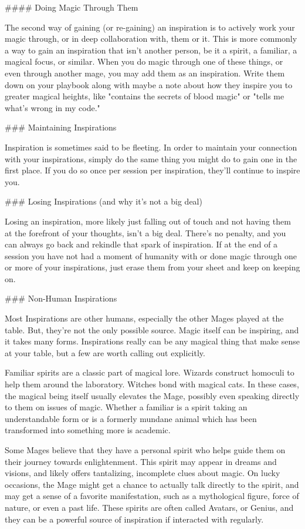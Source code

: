 \documentclass[
  oneside,
  statementpaper,
  9pt]{memoir}
\begin{document}
\begin{Player}
#### Doing Magic Through Them

The second way of gaining (or re-gaining) an inspiration is to actively work your magic through, or in deep collaboration with, them or it. This is more commonly a way to gain an inspiration that isn’t another person, be it a spirit, a familiar, a magical focus, or similar. When you do magic through one of these things, or even through another mage, you may add them as an inspiration. Write them down on your playbook along with maybe a note about how they inspire you to greater magical heights, like "contains the secrets of blood magic" or "tells me what's wrong in my code."

### Maintaining Inspirations

Inspiration is sometimes said to be fleeting. In order to maintain your connection with your inspirations, simply do the same thing you might do to gain one in the first place. If you do so once per session per inspiration, they’ll continue to inspire you.

### Losing Inspirations (and why it’s not a big deal)

Losing an inspiration, more likely just falling out of touch and not having them at the forefront of your thoughts, isn’t a big deal. There’s no penalty, and you can always go back and rekindle that spark of inspiration. If at the end of a session you have not had a moment of humanity with or done magic through one or more of your inspirations, just erase them from your sheet and keep on keeping on.

### Non-Human Inspirations

Most Inspirations are other humans, especially the other Mages played at the table. But, they’re not the only possible source. Magic itself can be inspiring, and it takes many forms. Inspirations really can be any magical thing that make sense at your table, but a few are worth calling out explicitly.

Familiar spirits are a classic part of magical lore. Wizards construct homoculi to help them around the laboratory. Witches bond with magical cats. In these cases, the magical being itself usually elevates the Mage, possibly even speaking directly to them on issues of magic. Whether a familiar is a spirit taking an understandable form or is a formerly mundane animal which has been transformed into something more is academic.

Some Mages believe that they have a personal spirit who helps guide them on their journey towards enlightenment. This spirit may appear in dreams and visions, and likely offers tantalizing, incomplete clues about magic. On lucky occasions, the Mage might get a chance to actually talk directly to the spirit, and may get a sense of a favorite manifestation, such as a mythological figure, force of nature, or even a past life. These spirits are often called Avatars, or Genius, and they can be a powerful source of inspiration if interacted with regularly.


\end{Player}
\end{document}
